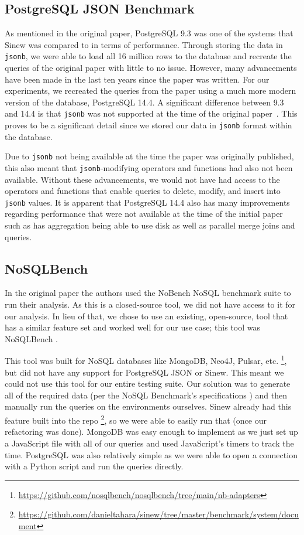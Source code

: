 \documentclass[sigconf]{acmart}
\begin{document}
    \subsection{PostgreSQL JSON Benchmark}
    As mentioned in the original paper, PostgreSQL 9.3 was one of the systems that Sinew was compared to in terms of performance. Through storing the data in \texttt{jsonb}, we were able to load all 16 million rows to the database and recreate the queries of the original paper with little to no issue. However, many advancements have been made in the last ten years since the paper was written. For our experiments, we recreated the queries from the paper using a much more modern version of the database, PostgreSQL 14.4. A significant difference between 9.3 and 14.4 is that \texttt{jsonb} was not supported at the time of the original paper~\cite{PostgtesVersions}. This proves to be a significant detail since we stored our data in \texttt{jsonb} format within the database. 

    Due to \texttt{jsonb} not being available at the time the paper was originally published, this also meant that \texttt{jsonb}-modifying operators and functions had also not been available. Without these advancements, we would not have had access to the operators and functions that enable queries to delete, modify, and insert into \texttt{jsonb} values. It is apparent that PostgreSQL 14.4 also has many improvements regarding performance that were not available at the time of the initial paper such as has aggregation being able to use disk as well as parallel merge joins and queries. 

    \subsection{NoSQLBench}
    In the original paper the authors used the NoBench NoSQL benchmark suite to run their analysis. As this is a closed-source tool, we did not have access to it for our analysis. In lieu of that, we chose to use an existing, open-source, tool that has a similar feature set and worked well for our use case; this tool was NoSQLBench \cite{NoSQLBench}. 
    
    This tool was built for NoSQL databases like MongoDB, Neo4J, Pulsar, etc. \footnote{\url{https://github.com/nosqlbench/nosqlbench/tree/main/nb-adapters}}, but did not have any support for PostgreSQL JSON or Sinew. This meant we could not use this tool for our entire testing suite. Our solution was to generate all of the required data (per the NoSQL Benchmark's specifications \cite{Chasseur_Li_Patel_2013}) and then manually run the queries on the environments ourselves. Sinew already had this feature built into the repo \footnote{\url{https://github.com/danieltahara/sinew/tree/master/benchmark/system/document}}, so we were able to easily run that (once our refactoring was done). MongoDB was easy enough to implement as we just set up a JavaScript file with all of our queries and used JavaScript's timers to track the time. PostgreSQL was also relatively simple as we were able to open a connection with a Python script and run the queries directly. 
\end{document}
